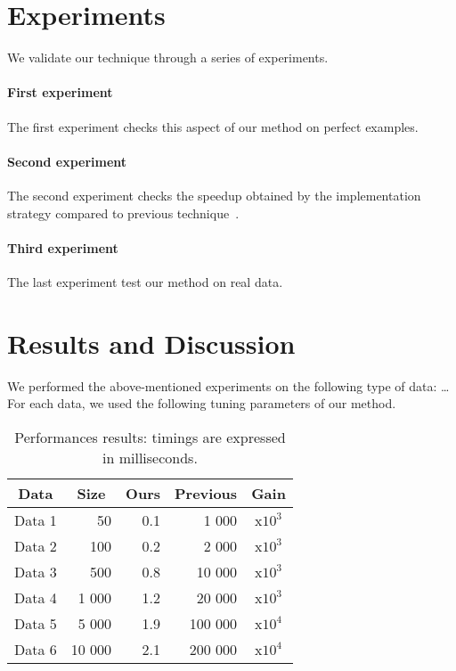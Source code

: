 \documentclass[10pt, conference]{IEEEtran}
\begin{document}
\section{Experiments}
%
We validate our technique through a series of experiments.


\paragraph*{First experiment}
%
The first experiment checks this aspect of our method on perfect examples.


\paragraph*{Second experiment}
%
The second experiment checks the speedup obtained by the implementation strategy compared to previous technique~\cite{Sibgrapi2015}.


\paragraph*{Third experiment}
%
The last experiment test our method on real data.



\section{Results and Discussion}
%
We performed the above-mentioned experiments on the following type of data: \ldots{} For each data, we used the following tuning parameters of our method.


\begin{table}
\caption{Performances results: timings are expressed in milliseconds.}
\label{tab:perfs}
\centering
\begin{tabular}{lr|rr|c}
\multicolumn{1}{c}{\bf Data} &
\multicolumn{1}{c|}{\bf Size} &
\multicolumn{1}{c}{\bf Ours} &
\multicolumn{1}{c|}{\bf Previous} &
\multicolumn{1}{c}{\bf Gain} \\ \hline
Data 1	&        50 	& 0.1 &     1 000	& x$10^3$ \\
Data 2	&      100 	& 0.2 &     2 000	& x$10^3$ \\
Data 3	&      500 	& 0.8 &   10 000	& x$10^3$ \\
Data 4	&   1 000 	& 1.2 &   20 000	& x$10^3$ \\
Data 5	&   5 000 	& 1.9 & 100 000	& x$10^4$ \\
Data 6	& 10 000 	& 2.1 & 200 000	& x$10^4$
\end{tabular}
\end{table}
%
\end{document}
